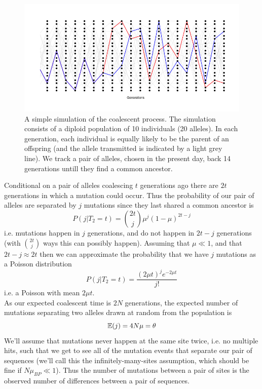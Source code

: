 \begin{figure}
\begin{center}
\includegraphics[width=\textwidth]{figures/Coalescent.png}
\end{center}
\caption{A simple simulation of the coalescent process. The simulation
  consists of a diploid population of 10 individuals (20 alleles). In
  each generation, each individual is equally likely to be the parent
  of an offspring (and the allele transmitted is indicated by a light
  grey line).  We track a
  pair of alleles, chosen in the present day, back 14 generations
  untill they find a common ancestor.} \label{fig:Coalescent_simulation}
\end{figure}



Conditional on a pair of alleles coalescing $t$ generations ago
there are $2t$ generations in which a mutation could occur. Thus the
probability of our pair of alleles are separated by $j$ mutations
since they last shared a common ancestor is
\begin{equation}
P(j | T_2 = t ) = {2t \choose j} \mu^{j} (1-\mu)^{2t-j}
\end{equation}
i.e. mutations happen in $j$ generations, and do not happen in $2t-j$
generations (with ${2t \choose j}$ ways this can possibly
happen). Assuming that $\mu \ll 1$, and that $2t-j \approx 2t$ then we
can approximate the probability that we have $j$ mutations as a
Poisson distribution
\begin{equation}
P(j | T_2 = t ) = \frac{ (2 \mu t )^{j} e^{-2\mu t}}{j!}
\end{equation}
i.e. a Poisson with mean $2\mu t $. \\

As our expected coalescent time is $2N$ generations, the expected
number of mutations separating two alleles drawn at random from the
population is
\begin{equation}
\mathbb{E}(j) = 4N\mu = \theta
\end{equation}
We'll assume that mutations never happen at the same site twice,
i.e. no multiple hits, such that we get to see all of the mutation events that separate our pair
of sequences (we'll call this the infinitely-many-sites assumption,
which should be fine if $N\mu_{BP} \ll 1$). Thus the number of
mutations between a pair of sites is the observed number of
differences between a pair of sequences. \\


